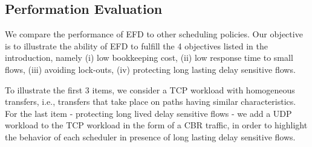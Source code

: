 \documentclass[preprint,12pt]{elsarticle}
\begin{document}
\subsection{Performation Evaluation}
We compare the performance of EFD to other scheduling policies. Our objective is to illustrate the ability of EFD to fulfill the 4 objectives listed in the introduction, namely (i) low bookkeeping cost, (ii) low response time to small flows, (iii) avoiding lock-outs, (iv) protecting long lasting delay sensitive flows.%

To illustrate the first 3 items, we consider a TCP workload with homogeneous transfers, i.e., transfers that take place on paths having similar characteristics. For the last item - protecting long lived delay sensitive flows - we add a UDP workload to the TCP workload in the form of a CBR traffic,  in order to highlight the behavior of each scheduler in presence of long lasting delay sensitive flows. %




 
\end{document}

